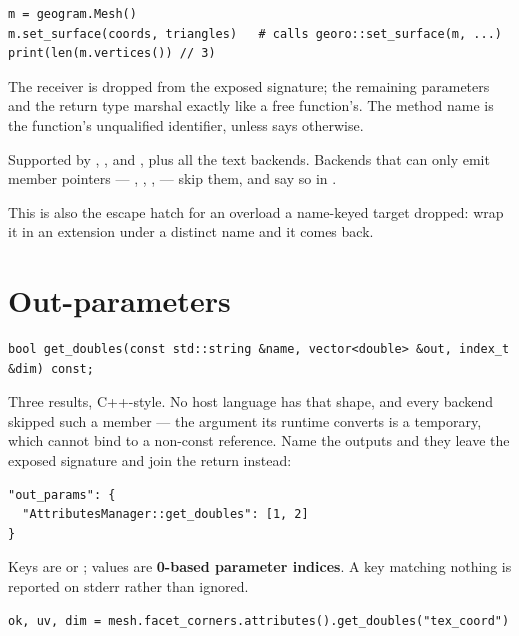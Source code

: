 \begin{lstlisting}[style=py]
m = geogram.Mesh()
m.set_surface(coords, triangles)   # calls georo::set_surface(m, ...)
print(len(m.vertices()) // 3)
\end{lstlisting}

The receiver is dropped from the exposed signature; the remaining parameters and
the return type marshal exactly like a free function's. The method name is the
function's unqualified identifier, unless  says otherwise.

Supported by , ,  and , plus
all the text backends. Backends that can only emit member pointers ---
, , ,  --- skip them, and say so in
.

This is also the escape hatch for an overload a name-keyed target dropped: wrap
it in an extension under a distinct name and it comes back.

\section{Out-parameters}
\label{sec:outparams}

\begin{lstlisting}[style=cpp]
bool get_doubles(const std::string &name, vector<double> &out, index_t &dim) const;
\end{lstlisting}

Three results, C++-style. No host language has that shape, and every backend
skipped such a member --- the argument its runtime converts is a temporary,
which cannot bind to a non-const reference. Name the outputs and they leave the
exposed signature and join the return instead:

\begin{lstlisting}[style=json]
"out_params": {
  "AttributesManager::get_doubles": [1, 2]
}
\end{lstlisting}

Keys are  or ; values are
\textbf{0-based parameter indices}. A key matching nothing is reported on
stderr rather than ignored.

\begin{lstlisting}[style=py]
ok, uv, dim = mesh.facet_corners.attributes().get_doubles("tex_coord")
\end{lstlisting}

